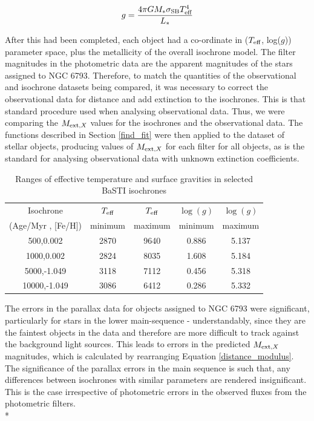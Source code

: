 \documentclass[12pt, a4paper]{report}
\begin{document}
\begin{equation}
\label{gravity_LT_calc}
g = \frac{4 \pi G M_{*} \sigma_{\textnormal{SB}} T_{\textnormal{eff}}^{4}}{L_{*}}
\end{equation}

After this had been completed, each object had a co-ordinate in ($T_{\textnormal{eff}}$, log($g$)) parameter space, plus the metallicity of the overall isochrone model. The filter magnitudes in the photometric data are the apparent magnitudes of the stars assigned to NGC 6793. Therefore, to match the quantities of the observational and isochrone datasets being compared, it was necessary to correct the observational data for distance and add extinction to the isochrones. This is that standard procedure used when analysing observational data. Thus, we were comparing the $M_{\textnormal{ext},X}$ values for the isochrones and the observational data. The functions described in Section \ref{find_fit} were then applied to the dataset of stellar objects, producing values of $M_{\textnormal{ext},X}$ for each filter for all objects, as is the standard for analysing observational data with unknown extinction coefficients.

\begin{table}
\begin{center}
\begin{tabular}{ccccc}
\hline
Isochrone & $T_{\textnormal{eff}}$ & $T_{\textnormal{eff}}$ & $\log(g)$ & $\log(g)$ \\
(Age/Myr , [Fe/H]) & minimum & maximum & minimum & maximum \\
\hline
500,0.002 & 2870 & 9640 & 0.886 & 5.137 \\
1000,0.002 & 2824 & 8035 & 1.608 & 5.184 \\
5000,-1.049 & 3118 & 7112 & 0.456 & 5.318 \\
10000,-1.049 & 3086 & 6412 & 0.286 & 5.332 \\
\hline
\end{tabular}
\caption{Ranges of effective temperature and surface gravities in selected BaSTI isochrones}
\label{variable_ranges}
\end{center}
\end{table}

The errors in the parallax data for objects assigned to NGC 6793 were significant, particularly for stars in the lower main-sequence - understandably, since they are the faintest objects in the data and therefore are more difficult to track against the background light sources. This leads to errors in the predicted $M_{\textnormal{ext},X}$ magnitudes, which is calculated by rearranging Equation \ref{distance_modulus}. The significance of the parallax errors in the main sequence is such that, any differences between isochrones with similar parameters are rendered insignificant. This is the case irrespective of photometric errors in the observed fluxes from the photometric filters.\\*
\end{document}
